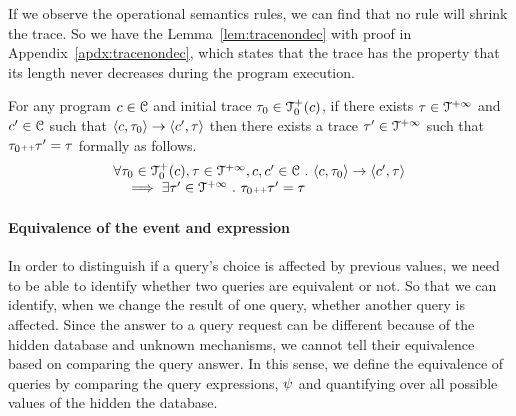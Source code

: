 {{If we observe the operational semantics rules, we can find that no rule will shrink the trace. 
So we have the Lemma~\ref{lem:tracenondec} with proof in Appendix~\ref{apdx:tracenondec}, 
which states that the trace has the property that its length never decreases during the program execution.
\begin{lem}
\label{lem:tracenondec}
For any program $c \in \mathcal{C}$ and initial trace $\mathtt{\tau}_0 \in \mathcal{T}^{+}_0(c)$,
if there exists $\mathtt{\tau} \in \mathcal{T}^{+\infty}$ and $c' \in \mathcal{C} $ such that $\langle c, \mathtt{\tau}_0 \rangle \rightarrow \langle c', \mathtt{\tau} \rangle $
then there exists a trace $\mathtt{\tau}' \in \mathcal{T}^{+\infty}$ such that $\mathtt{\tau}_0 {\scriptscriptstyle ++} \mathtt{\tau}' = \mathtt{\tau}$ formally as follows.
%
\[
 \begin{array}{l}
 \forall \mathtt{\tau}_0 \in \mathcal{T}^{+}_0(c), \mathtt{\tau} \in \mathcal{T}^{+\infty}, c, c' \in \mathcal{C} ~.~
 \langle c, \mathtt{\tau}_0 \rangle \rightarrow \langle c', \mathtt{\tau} \rangle 
 \\ \quad
 \implies \exists \mathtt{\tau}' \in \mathcal{T}^{+\infty} ~.~ \mathtt{\tau}_0 {\scriptscriptstyle ++} \mathtt{\tau}' = \mathtt{\tau} 
 \end{array}
\]
\end{lem}

\paragraph{Equivalence of the event and expression}

In order to distinguish if a query's choice is affected by previous values, 
we need to be able to identify whether two queries are equivalent or not. So that we can identify, when we change the result of one query, 
whether another query is affected. 
Since the answer to a query request can be different because of the hidden database and unknown mechanisms,
we cannot tell their equivalence based on comparing the query answer.
In this sense, we 
define the equivalence of queries by comparing the query expressions, $\psi$
and quantifying over all possible values of the hidden the database.

}}
